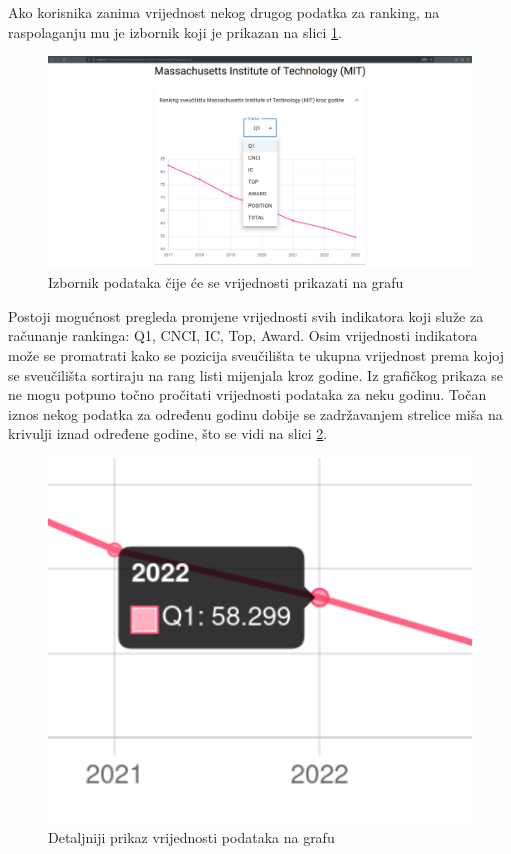 \documentclass[times, utf8, zavrsni]{fer}
\begin{document}
Ako korisnika zanima vrijednost nekog drugog podatka za ranking, na raspolaganju mu je izbornik 
koji je prikazan na slici \ref{fig:unipage2}. 
\begin{figure}[htb]
    \hspace*{-2cm}  
       \includegraphics[scale=0.21]{uni2.png} 
       \caption{Izbornik podataka čije će se vrijednosti prikazati na grafu}
       \label{fig:unipage2}
       \end{figure}
Postoji mogućnost pregleda promjene vrijednosti svih indikatora koji služe za računanje rankinga: Q1, CNCI, IC, Top, Award. 
Osim vrijednosti indikatora može se promatrati kako se pozicija  sveučilišta te ukupna vrijednost  prema kojoj se sveučilišta 
sortiraju na rang listi mijenjala kroz godine. Iz grafičkog prikaza se ne mogu potpuno točno pročitati vrijednosti podataka za neku godinu. Točan iznos 
nekog podatka za određenu godinu dobije se zadržavanjem strelice miša na krivulji iznad određene godine, što se vidi na slici \ref{fig:detail}.
\begin{figure}[htb]
            \centering
               \includegraphics[scale=0.4]{detail.png} 
               \caption{Detaljniji prikaz vrijednosti podataka na grafu}
               \label{fig:detail}
               \end{figure}           
\end{document}
